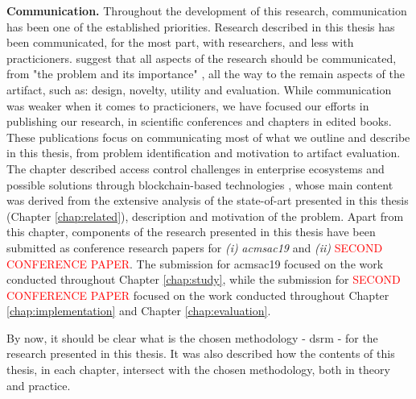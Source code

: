 \textbf{Communication.} Throughout the development of this research, communication has been one of the established priorities. Research described in this thesis has been communicated, for the most part, with researchers, and less with practicioners. \citeauthor{peffers_design_2007} \cite{peffers_design_2007} suggest that all aspects of the research should be communicated, from "the problem and its importance" \cite[14]{peffers_design_2007}, all the way to the remain aspects of the artifact, such as: design, novelty, utility and evaluation. While communication was weaker when it comes to practicioners, we have focused our efforts in publishing our research, in scientific conferences and chapters in edited books. These publications focus on communicating most of what we outline and describe in this thesis, from problem identification and motivation to artifact evaluation. The chapter described access control challenges in enterprise ecosystems and possible solutions through blockchain-based technologies \cite{bryan_christiansen_access_2018}, whose main content was derived from the extensive analysis of the state-of-art presented in this thesis (Chapter \ref{chap:related}), description and motivation of the problem. Apart from this chapter, components of the research presented in this thesis have been submitted as conference research papers for \emph{(i)} \textit{\gls{acmsac19}} and \emph{(ii)} \textcolor{red}{SECOND CONFERENCE PAPER}. The submission for \gls{acmsac19} focused on the work conducted throughout Chapter \ref{chap:study}, while the submission for \textcolor{red}{SECOND CONFERENCE PAPER} focused on the work conducted throughout Chapter \ref{chap:implementation} and Chapter \ref{chap:evaluation}.

By now, it should be clear what is the chosen methodology - \glsdesc{dsrm} \cite{peffers_design_2007}- for the research presented in this thesis. It was also described how the contents of this thesis, in each chapter, intersect with the chosen methodology, both in theory and practice.